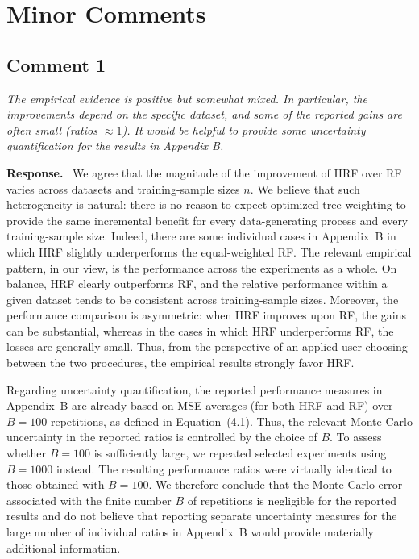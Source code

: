 \documentclass[12pt]{article}
\newcommand{\comment}[1]{\begin{refbox}\itshape #1\end{refbox}}
\newcommand{\response}{\medskip\noindent\textbf{Response.}\ }
\begin{document}
\newpage
\section*{Minor Comments}

\subsection*{Comment 1}

\comment{The empirical evidence is positive but somewhat mixed. In
particular, the improvements depend on the specific dataset, and some of the
reported gains are often small (ratios $\approx 1$). It would be helpful to
provide some uncertainty quantification for the results in Appendix B.}

\response
We agree that the magnitude of the improvement of HRF over RF varies across datasets and training-sample sizes $n$. We believe that such heterogeneity is natural: there is no reason to expect optimized tree weighting to provide the same incremental benefit for every data-generating process and every training-sample size. Indeed, there are some individual cases in Appendix~B in which HRF slightly underperforms the equal-weighted RF. The relevant empirical pattern, in our view, is the performance across the experiments as a whole. On balance, HRF clearly outperforms RF, and the relative performance within a given dataset tends to be consistent across training-sample sizes. Moreover, the performance comparison is asymmetric: when HRF improves upon RF, the gains can be substantial, whereas in the cases in which HRF underperforms RF, the losses are generally small. Thus, from the perspective of an applied user choosing between the two procedures, the empirical results strongly favor HRF.

Regarding uncertainty quantification, the reported performance measures in Appendix~B are already based on MSE
averages (for both HRF and RF)
over $B=100$ repetitions, as defined in Equation~(4.1). Thus, the relevant Monte Carlo uncertainty in the reported ratios is controlled by the choice of $B$. To assess whether $B=100$ is sufficiently large, we repeated selected experiments using $B=1000$ instead. The resulting performance ratios were virtually identical to those obtained with $B=100$. We therefore conclude that the Monte Carlo error associated with the finite number $B$ of repetitions is negligible for the reported results
and do not believe that reporting separate uncertainty measures for the large number of individual ratios in Appendix~B would provide materially additional information.
\end{document}
